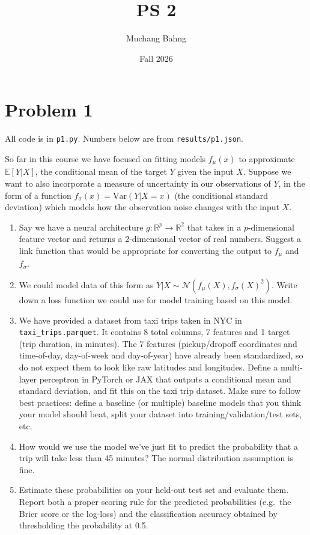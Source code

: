 \documentclass{article}
\newcounter{exercise}[section]
\newcounter{code}[section]
\begin{document}
\title{PS 2}
\author{Muchang Bahng}
\date{Fall 2026}

\maketitle

\section{Problem 1}

All code is in \texttt{p1.py}. Numbers below are from \texttt{results/p1.json}.

\begin{exercise}[]
  So far in this course we have focused on fitting models $f_\mu(x)$ to approximate $\mathbb E[Y|X]$, the conditional mean of the target $Y$ given the input $X$. Suppose we want to also incorporate a measure of uncertainty in our observations of $Y$, in the form of a function $f_\sigma(x)=\mathrm{Var}(Y|X=x)$ (the conditional standard deviation) which models how the observation noise changes with the input $X$.
  \begin{enumerate}[label=(\alph*)]
    \item Say we have a neural architecture $g:\mathbb R^p\to\mathbb R^2$ that takes in a $p$-dimensional feature vector and returns a 2-dimensional vector of real numbers. Suggest a link function that would be appropriate for converting the output to $f_\mu$ and $f_\sigma$.
    \item We could model data of this form as $Y|X\sim\mathcal N(f_\mu(X),f_\sigma(X)^2)$. Write down a loss function we could use for model training based on this model.
    \item We have provided a dataset from taxi trips taken in NYC in \texttt{taxi\_trips.parquet}. It contains 8 total columns, 7 features and 1 target (trip duration, in minutes). The 7 features (pickup/dropoff coordinates and time-of-day, day-of-week and day-of-year) have already been standardized, so do not expect them to look like raw latitudes and longitudes. Define a multi-layer perceptron in PyTorch or JAX that outputs a conditional mean and standard deviation, and fit this on the taxi trip dataset. Make sure to follow best practices: define a baseline (or multiple) baseline models that you think your model should beat, split your dataset into training/validation/test sets, etc.
    \item How would we use the model we've just fit to predict the probability that a trip will take less than 45 minutes? The normal distribution assumption is fine.
    \item Estimate these probabilities on your held-out test set and evaluate them. Report both a proper scoring rule for the predicted probabilities (e.g.\ the Brier score or the log-loss) and the classification accuracy obtained by thresholding the probability at 0.5.
  \end{enumerate}
\end{exercise}
\end{document}
